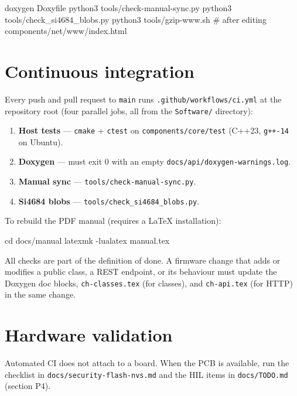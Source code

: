 \begin{drcode}
doxygen Doxyfile
python3 tools/check-manual-sync.py
python3 tools/check_si4684_blobs.py
python3 tools/gzip-www.sh    # after editing components/net/www/index.html
\end{drcode}

\section{Continuous integration}

Every push and pull request to \texttt{main} runs
\texttt{.github/workflows/ci.yml} at the repository root (four parallel
jobs, all from the \texttt{Software/} directory):

\begin{enumerate}
  \item \textbf{Host tests} --- \texttt{cmake} + \texttt{ctest} on
        \texttt{components/core/test} (C++23, \texttt{g++-14} on Ubuntu).
  \item \textbf{Doxygen} --- must exit 0 with an empty
        \texttt{docs/api/doxygen-warnings.log}.
  \item \textbf{Manual sync} --- \texttt{tools/check-manual-sync.py}.
  \item \textbf{Si4684 blobs} --- \texttt{tools/check\_si4684\_blobs.py}.
\end{enumerate}

To rebuild the PDF manual (requires a LaTeX installation):

\begin{drcode}
cd docs/manual
latexmk -lualatex manual.tex
\end{drcode}

\begin{drcaution}
All checks are part of the definition of done. A firmware change that
adds or modifies a public class, a REST endpoint, or its behaviour must
update the Doxygen doc blocks, \texttt{ch-classes.tex} (for classes), and
\texttt{ch-api.tex} (for HTTP) in the same change.
\end{drcaution}

\section{Hardware validation}

Automated CI does not attach to a board. When the PCB is available, run the
checklist in \texttt{docs/security-flash-nvs.md} and the HIL items in
\texttt{docs/TODO.md} (section P4).
